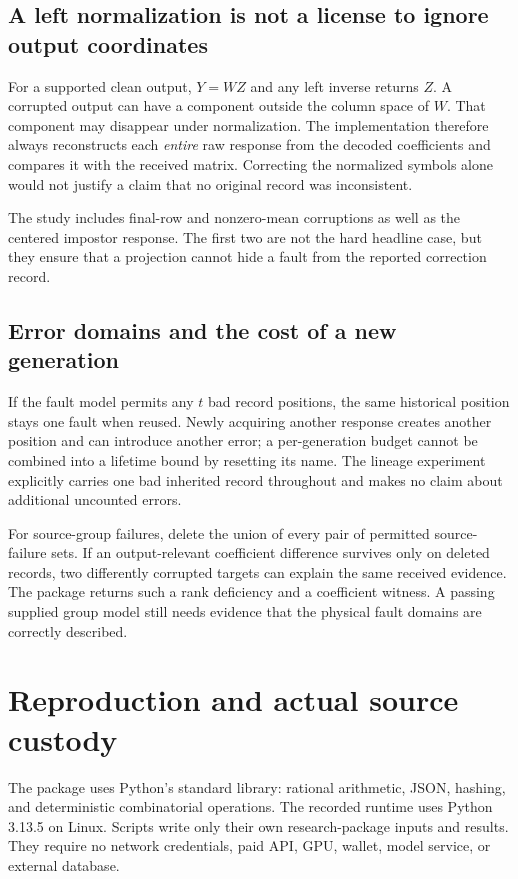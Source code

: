 \documentclass[11pt,letterpaper]{article}
\theoremstyle{remark}\newtheorem{remark}{Remark}[section]
\begin{document}
\subsection{A left normalization is not a license to ignore output coordinates}
For a supported clean output, $Y=WZ$ and any left inverse returns $Z$. A corrupted output can have a component outside the column space of $W$. That component may disappear under normalization. The implementation therefore always reconstructs each \emph{entire} raw response from the decoded coefficients and compares it with the received matrix. Correcting the normalized symbols alone would not justify a claim that no original record was inconsistent.

The study includes final-row and nonzero-mean corruptions as well as the centered impostor response. The first two are not the hard headline case, but they ensure that a projection cannot hide a fault from the reported correction record.

\subsection{Error domains and the cost of a new generation}
If the fault model permits any $t$ bad record positions, the same historical position stays one fault when reused. Newly acquiring another response creates another position and can introduce another error; a per-generation budget cannot be combined into a lifetime bound by resetting its name. The lineage experiment explicitly carries one bad inherited record throughout and makes no claim about additional uncounted errors.

For source-group failures, delete the union of every pair of permitted source-failure sets. If an output-relevant coefficient difference survives only on deleted records, two differently corrupted targets can explain the same received evidence. The package returns such a rank deficiency and a coefficient witness. A passing supplied group model still needs evidence that the physical fault domains are correctly described.

\section{Reproduction and actual source custody}
\label{app:repro}
The package uses Python's standard library: rational arithmetic, JSON, hashing, and deterministic combinatorial operations. The recorded runtime uses Python 3.13.5 on Linux. Scripts write only their own research-package inputs and results. They require no network credentials, paid API, GPU, wallet, model service, or external database.
\end{document}

